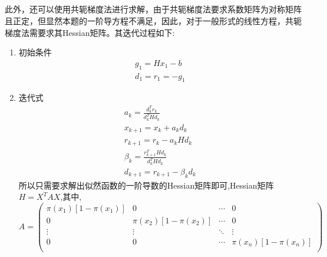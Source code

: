 \documentclass[lang=cn,a4paper,cite=authoryear]{elegantpaper}
\begin{document}
\subsection*{}
\par 此外，还可以使用共轭梯度法进行求解，由于共轭梯度法要求系数矩阵为对称矩阵且正定，但显然本题的一阶导方程不满足，因此，对于一般形式的线性方程，共轭梯度法需要求其Hessian矩阵。其迭代过程如下:
\begin{enumerate}[(1)]
	\item 初始条件
	      $$
	      \begin{gathered}
	      	g_{1}=H x_{1}-b \\
	      	d_{1}=r_{1}=-g_{1}
	      \end{gathered}
	      $$
	\item 迭代式
	$$
	\begin{gathered}
		a_{k}=\frac{d_{k}^{T} r_{k}}{d_{k}^{T} H d_{k}} \\
		x_{k+1}=x_{k}+a_{k} d_{k} \\
		r_{k+1}=r_{k}-a_{k} H d_{k} \\
		\beta_{k}=\frac{r_{k+1}^{T} H d_{k}}{d_{k}^{T} H d_{k}} \\
		d_{k+1}=r_{k+1}-\beta_{k} d_{k}
	\end{gathered}
	$$
所以只需要求解出似然函数的一阶导数的Hessian矩阵即可,Hessian矩阵$H=X^TAX$,其中,
$$
A=\left( \begin{matrix}
	\pi \left( x_1 \right) \left[ 1-\pi \left( x_1 \right) \right]&		0&		\cdots&		0\\
	0&		\pi \left( x_2 \right) \left[ 1-\pi \left( x_2 \right) \right]&		\cdots&		0\\
	\vdots&		\vdots&		\ddots&		\vdots\\
	0&		0&		\cdots&		\pi \left( x_n \right) \left[ 1-\pi \left( x_n \right) \right]\\
\end{matrix} \right) 
$$


\end{enumerate}
\end{document}

